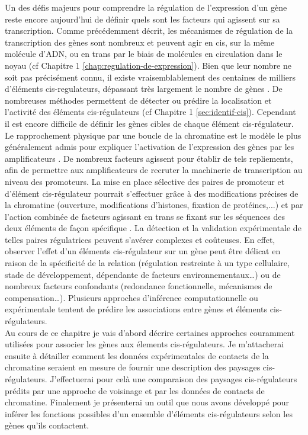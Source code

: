 \newpage
Un des défis majeurs pour comprendre la régulation de l’expression d’un gène reste encore aujourd’hui de définir quels sont les facteurs qui agissent sur sa transcription. Comme précédemment décrit, les mécanismes de régulation de la transcription des gènes sont nombreux et peuvent agir en cis, sur la même molécule d’ADN, ou en trans par le biais de molécules en circulation dans le noyau (cf Chapitre 1 \ref{chap:regulation-de-expression}). Bien que leur nombre ne soit pas précisément connu, il existe vraisemblablement des centaines de milliers d’éléments \gls{cis}-regulateurs, dépassant très largement le nombre de gènes \citep{encode_project_consortium_integrated_2012}. De nombreuses méthodes permettent de détecter ou prédire la localisation et l’activité des éléments \gls{cis}-régulateurs (cf Chapitre 1 \ref{sec:identif-cis}). Cependant il est encore difficile de définir les gènes cibles de chaque élément \gls{cis}-régulateur. Le rapprochement physique par une boucle de la chromatine est le modèle le plus généralement admis pour expliquer l’activation de l’expression des gènes par les amplificateurs \citep{blackwood_going_1998,bulger_looping_1999, marsman_long_2012}. De nombreux facteurs agissent pour établir de tels repliements, afin de permettre aux amplificateurs de recruter la machinerie de transcription au niveau des promoteurs. La mise en place sélective des paires de promoteur et d’élément \gls{cis}-régulateur pourrait s’effectuer grâce à des modifications précises de la chromatine (ouverture, modifications d’histones, fixation de protéines,...) et par l’action combinée de facteurs agissant en trans se fixant sur les séquences des deux éléments de façon spécifique \citep{ernst_interplay_2013}. La détection et la validation expérimentale de telles paires régulatrices peuvent s’avérer complexes et coûteuses. En effet, observer l’effet d’un éléments \gls{cis}-régulateur sur un gène peut être délicat en raison de la spécificité de la relation (régulation restreinte à un type cellulaire, stade de développement, dépendante de facteurs environnementaux…) ou de nombreux facteurs confondants (redondance fonctionnelle, mécanismes de compensation…). Plusieurs approches d’inférence computationnelle ou expérimentale tentent de prédire les associations entre gènes et éléments \gls{cis}-régulateurs.\\

Au cours de ce chapitre je vais d’abord décrire certaines approches couramment utilisées pour associer les gènes aux élements \gls{cis}-régulateurs. Je m’attacherai ensuite à détailler comment les données expérimentales de contacts de la chromatine seraient en mesure de fournir une description des paysages \gls{cis}-régulateurs. J’effectuerai pour celà une comparaison des paysages \gls{cis}-régulateurs prédits par une approche de voisinage et par les données de contacts de chromatine. Finalement je présenterai un outil que nous avons développé pour inférer les fonctions possibles d’un ensemble d’éléments \gls{cis}-régulateurs selon les gènes qu’ils contactent.

